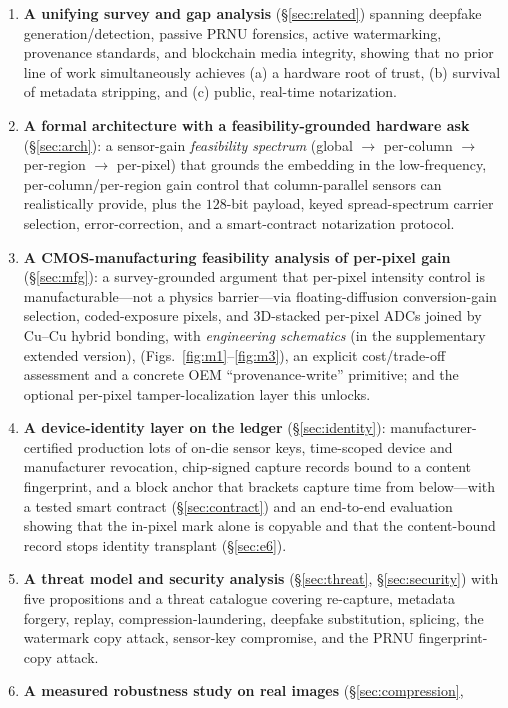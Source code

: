 \documentclass[journal]{IEEEtran}
\begin{document}
\begin{enumerate}
\item \textbf{A unifying survey and gap analysis} (\S\ref{sec:related})
spanning deepfake generation/detection, passive PRNU forensics, active
watermarking, provenance standards, and blockchain media integrity, showing
that no prior line of work simultaneously achieves (a) a hardware root of
trust, (b) survival of metadata stripping, and (c) public, real-time
notarization.
\item \textbf{A formal architecture with a feasibility-grounded hardware ask}
(\S\ref{sec:arch}): a sensor-gain \emph{feasibility spectrum} (global $\to$
per-column $\to$ per-region $\to$ per-pixel) that grounds the embedding in the
low-frequency, per-column/per-region gain control that column-parallel
sensors can realistically provide, plus the $128$-bit payload, keyed
spread-spectrum carrier selection, error-correction, and a smart-contract
notarization protocol.
\item \textbf{A CMOS-manufacturing feasibility analysis of per-pixel gain}
(\S\ref{sec:mfg}): a survey-grounded argument that per-pixel intensity control is
manufacturable---not a physics barrier---via floating-diffusion
conversion-gain selection, coded-exposure pixels, and 3D-stacked per-pixel ADCs
joined by Cu--Cu hybrid bonding, with \emph{engineering schematics}
\ifshort(in the supplementary extended version), \else(Figs.~\ref{fig:m1}--\ref{fig:m3}), \fi an explicit cost/trade-off assessment and a
concrete OEM ``provenance-write'' primitive; and the optional per-pixel
tamper-localization layer this unlocks.
\item \textbf{A device-identity layer on the ledger} (\S\ref{sec:identity}):
manufacturer-certified production lots of on-die sensor keys, time-scoped device
and manufacturer revocation, chip-signed capture records bound to a content
fingerprint, and a block anchor that brackets capture time from below---with a
tested smart contract (\S\ref{sec:contract}) and an end-to-end evaluation
showing that the in-pixel mark alone is copyable and that the content-bound
record stops identity transplant (\S\ref{sec:e6}).
\item \textbf{A threat model and security analysis} (\S\ref{sec:threat},
\S\ref{sec:security}) with five propositions and a threat catalogue covering
re-capture, metadata forgery, replay, compression-laundering, deepfake
substitution, splicing, the watermark copy attack, sensor-key compromise, and the
PRNU fingerprint-copy attack.
\item \textbf{A measured robustness study on real images} (\S\ref{sec:compression},

\end{enumerate}
\end{document}
